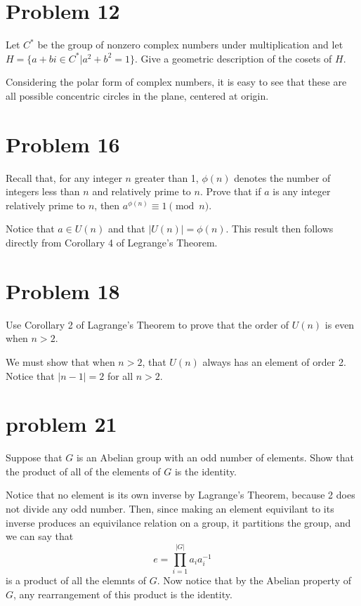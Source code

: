 \documentclass[12pt]{article}
\begin{document}
\section*{Problem 12}

Let $C^*$ be the group of nonzero complex numbers under multiplication
and let $H=\{a+bi\in C^*|a^2+b^2=1\}$.  Give a geometric description
of the cosets of $H$.

Considering the polar form of complex numbers, it is easy to see that these
are all possible concentric circles in the plane, centered at origin.

\section*{Problem 16}

Recall that, for any integer $n$ greater than 1, $\phi(n)$ denotes the number of
integers less than $n$ and relatively prime to $n$.  Prove that if $a$ is any
integer relatively prime to $n$, then $a^{\phi(n)}\equiv 1\pmod n$.

Notice that $a\in U(n)$ and that $|U(n)|=\phi(n)$.  This result then
follows directly from Corollary 4 of Legrange's Theorem.

\section*{Problem 18}

Use Corollary 2 of Lagrange's Theorem to prove that the order of $U(n)$ is even
when $n>2$.

We must show that when $n>2$, that $U(n)$ always has an element of order 2.
Notice that $|n-1|=2$ for all $n>2$.

\section*{problem 21}

Suppose that $G$ is an Abelian group with an odd number of elements.
Show that the product of all of the elements of $G$ is the identity.

Notice that no element is its own inverse by Lagrange's Theorem,
because 2 does not divide any odd number.  Then, since making
an element equivilant to its inverse produces an equivilance
relation on a group, it partitions the group, and
we can say that
\begin{equation*}
e = \prod_{i=1}^{|G|} a_ia_i^{-1}
\end{equation*}
is a product of all the elemnts of $G$.  Now notice that by the
Abelian property of $G$, any rearrangement of this product is the identity.
\end{document}
